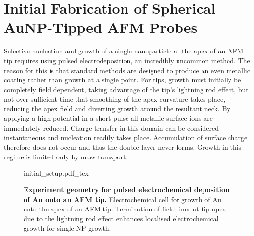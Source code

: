 \documentclass{article}
\begin{document}
\section{Initial Fabrication of Spherical AuNP-Tipped AFM Probes}
\label{sec:initial_fabrication}


Selective nucleation and growth of a single nanoparticle at the apex of an AFM tip requires using pulsed electrodeposition, an incredibly uncommon method. The reason for this is that standard methods are designed to produce an even metallic coating rather than growth at a single point. For tips, growth must initially be completely field dependent, taking advantage of the tip's lightning rod effect, but not over sufficient time that smoothing of the apex curvature takes place, reducing the apex field and diverting growth around the resultant neck. By applying a high potential in a short pulse all metallic surface ions are immediately reduced. Charge transfer in this domain can be considered instantaneous and nucleation readily takes place. Accumulation of surface charge therefore does not occur and thus the double layer never forms. Growth in this regime is limited only by mass transport.

\begin{figure}[bt]
\centering
{\fontsize{10pt}{1em}\selectfont \def\svgwidth{0.6\textwidth} {initial_setup.pdf_tex}}
\caption[Experiment geometry for pulsed electrochemical deposition of Au onto an AFM tip]{\textbf{Experiment geometry for pulsed electrochemical deposition of Au onto an AFM tip.} Electrochemical cell for growth of Au onto the apex of an AFM tip. Termination of field lines at tip apex due to the lightning rod effect enhances localised electrochemical growth for single NP growth.}
\label{fig:initial_setup}
\end{figure}
\end{document}
